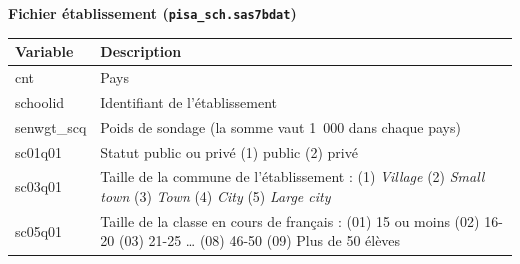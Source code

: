 \documentclass[12pt,twosided, notitlepage]{book}
\begin{document}
\textbf{Fichier établissement (\texttt{pisa\_sch.sas7bdat})}

\begin{longtable}[]{@{}ll@{}}
\toprule
\begin{minipage}[b]{0.38\columnwidth}\raggedright\strut
\textbf{Variable}\strut
\end{minipage} & \begin{minipage}[b]{0.55\columnwidth}\raggedright\strut
\textbf{Description}\strut
\end{minipage}\tabularnewline
\midrule
\endhead
\begin{minipage}[t]{0.38\columnwidth}\raggedright\strut
cnt\strut
\end{minipage} & \begin{minipage}[t]{0.55\columnwidth}\raggedright\strut
Pays\strut
\end{minipage}\tabularnewline
\begin{minipage}[t]{0.38\columnwidth}\raggedright\strut
schoolid\strut
\end{minipage} & \begin{minipage}[t]{0.55\columnwidth}\raggedright\strut
Identifiant de l'établissement\strut
\end{minipage}\tabularnewline
\begin{minipage}[t]{0.38\columnwidth}\raggedright\strut
senwgt\_scq\strut
\end{minipage} & \begin{minipage}[t]{0.55\columnwidth}\raggedright\strut
Poids de sondage (la somme vaut 1~000 dans chaque pays)\strut
\end{minipage}\tabularnewline
\begin{minipage}[t]{0.38\columnwidth}\raggedright\strut
sc01q01\strut
\end{minipage} & \begin{minipage}[t]{0.55\columnwidth}\raggedright\strut
Statut public ou privé (1) public (2) privé\strut
\end{minipage}\tabularnewline
\begin{minipage}[t]{0.38\columnwidth}\raggedright\strut
sc03q01\strut
\end{minipage} & \begin{minipage}[t]{0.55\columnwidth}\raggedright\strut
Taille de la commune de l'établissement : (1) \emph{Village} (2)
\emph{Small town} (3) \emph{Town} (4) \emph{City} (5) \emph{Large
city}\strut
\end{minipage}\tabularnewline
\begin{minipage}[t]{0.38\columnwidth}\raggedright\strut
sc05q01\strut
\end{minipage} & \begin{minipage}[t]{0.55\columnwidth}\raggedright\strut
Taille de la classe en cours de français : (01) 15 ou moins (02) 16-20
(03) 21-25 \ldots{} (08) 46-50 (09) Plus de 50 élèves\strut
\end{minipage}\tabularnewline
\bottomrule
\end{longtable}
\end{document}
